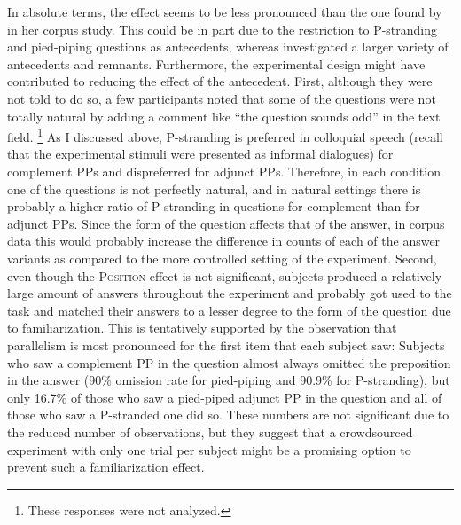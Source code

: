 In absolute terms, the effect seems to be less pronounced than the one found by \citet{nykiel2017} in her corpus study. This could be in part due to the restriction to P-stranding and pied-piping questions as antecedents, whereas \citet{nykiel2017} investigated a larger variety of antecedents and remnants. Furthermore, the experimental design might have contributed to reducing the effect of the antecedent. First, although they were not told to do so, a few participants noted that some of the questions were not totally natural by adding a comment like ``the question sounds odd'' in the text field.%
%
\footnote{These responses were not analyzed.}\afterfn%
%
As I discussed above, P-stranding is preferred in colloquial speech (recall that the experimental stimuli were presented as informal dialogues) for complement PPs and dispreferred for adjunct PPs. Therefore, in each condition one of the questions is not perfectly natural, and in natural settings there is probably a higher ratio of P-stranding in questions for complement than for adjunct PPs. Since the form of the question affects that of the answer, in corpus data this would probably increase the difference in counts of each of the answer variants as compared to the more controlled setting of the experiment. Second, even though the \textsc{Position} effect is not significant, subjects produced a relatively large amount of answers throughout the experiment and probably got used to the task and matched their answers to a lesser degree to the form of the question due to familiarization. This is tentatively supported by the observation that parallelism is most pronounced for the first item that each subject saw: Subjects who saw a complement PP in the question almost always omitted the preposition in the answer (90\% omission rate for pied-piping and 90.9\% for P-stranding), but only 16.7\% of those who saw a pied-piped adjunct PP in the question and all of those who saw a P-stranded one did so. These numbers are not significant due to the reduced number of observations, but they suggest that a crowdsourced experiment with only one trial per subject might be a promising option to prevent such a familiarization effect.

